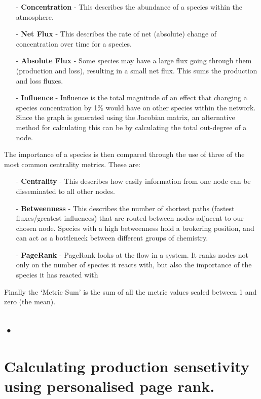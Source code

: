 \begin{itemize}
\item[-] \textbf{Concentration} - This describes the abundance of a species within the atmosphere. 
\item[-] \textbf{Net Flux} - This describes the rate of net (absolute) change of concentration over time for a species. 
\item[-] \textbf{Absolute Flux} - Some species may have a large flux going through them (production and loss), resulting in a small net flux. This sums the production and loss fluxes. 
\item[-] \textbf{Influence} - Influence is the total magnitude of an effect that changing a species concentration by 1\% would have on other species within the network. Since the graph is generated using the Jacobian matrix, an alternative method for calculating this can be by calculating the total out-degree of a node.  
\end{itemize}



The importance of a species is then compared through the use of three of the most common centrality metrics. These are:


\begin{itemize}
\item[-] \textbf{Centrality} - This describes how easily information from one node can be disseminated to all other nodes. 
\item[-] \textbf{Betweenness} - This describes the number of shortest paths (fastest fluxes/greatest influences) that are routed between nodes adjacent to our chosen node. Species with a high betweenness hold a brokering position, and can act as a bottleneck between different groups of chemistry. 
\item[-] \textbf{PageRank} - PageRank looks at the flow in a system. It ranks nodes not only on the number of species it reacts with, but also the importance of the species it has reacted with

\end{itemize}

Finally the `Metric Sum' is the sum of all the metric values scaled between 1 and zero (the mean).

\subsection{•}




\section{Calculating production sensetivity using personalised page rank.}

